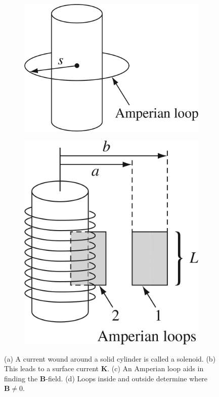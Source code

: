\documentclass[12pt]{article}
\begin{document}
\begin{figure}[ht]
\begin{subfigure}{0.07\textwidth}
\caption{ }
\end{subfigure}
\hfill
\begin{subfigure}{0.2\textwidth}
\includegraphics[width=\textwidth]{figures/5_36.jpg}
\caption{ }
\end{subfigure}
\hfill
\begin{subfigure}{0.15\textwidth}
\includegraphics[width=\textwidth]{figures/5_37.jpg}
\caption{ }
\end{subfigure}
\caption{\label{fig:1} (a) A current wound around a solid cylinder is called a solenoid.  (b) This leads to a surface current $\mathbf{K}$. (c) An Amperian loop aids in finding the $\mathbf{B}$-field. (d) Loops inside and outside determine where $\mathbf{B} \neq 0$.}
\end{figure}
\end{document}
